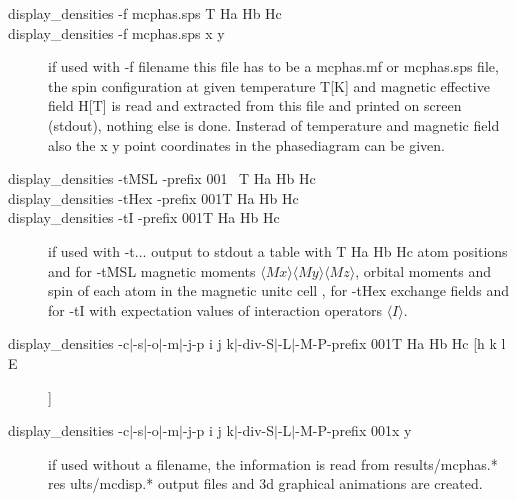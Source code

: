 \begin{description} 
\item[ display\_densities -f mcphas.sps T Ha Hb Hc]
\item[ display\_densities -f mcphas.sps x y]
 if used with -f filename this file has to be a mcphas.mf or mcphas.sps file,
the spin configuration
   at given temperature T[K] and magnetic effective field H[T]
    is read and extracted from this file and printed on screen (stdout), nothing
 else is done. Insterad of temperature and magnetic field also the x y point coordinates
in the phasediagram can be given.
\item[ display\_densities -tMSL \lbrack -prefix 001 \rbrack\, T Ha Hb Hc]
\item[ display\_densities -tHex \lbrack-prefix 001\rbrack T Ha Hb Hc]
\item[ display\_densities -tI \lbrack-prefix 001\rbrack T Ha Hb Hc]
 if used with -t... output to stdout a table with T Ha Hb Hc atom positions and
for -tMSL 
              magnetic moments $\langle Mx \rangle \langle My \rangle \langle Mz \rangle$, orbital moments and spin 
              of each atom in the magnetic unitc cell , for 
       -tHex  exchange fields and for 
       -tI    with expectation values of interaction operators $\langle I \rangle$.

\item[display\_densities \lbrack-c$|$-s$|$-o$|$-m$|$-j\rbrack \lbrack -p i j k$|$-div\rbrack \lbrack -S$|$-L$|$-M\rbrack \lbrack -P\rbrack \lbrack -prefix 001\rbrack T Ha Hb Hc [h k l E]]
\item[display\_densities \lbrack-c$|$-s$|$-o$|$-m$|$-j\rbrack \lbrack -p i j k$|$-div\rbrack \lbrack -S$|$-L$|$-M\rbrack \lbrack -P\rbrack \lbrack -prefix 001\rbrack  x y]
 if used without a filename, the information is read from results/mcphas.* res
ults/mcdisp.*
   output files and 3d graphical animations are created.
\end{description} 

